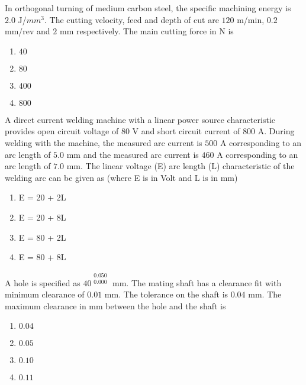     \item In orthogonal turning of medium carbon steel, the specific machining energy is $2.0$ J/$mm^{3}$. The cutting velocity, feed and depth of cut are $120$ m/min, $0.2$ mm/rev and $2$ mm respectively. The main cutting force in N is
    \begin{multicols}{4}
        \begin{enumerate}
            \item $40$
            \item $80$
            \item $400$
            \item $800$
        \end{enumerate}
    \end{multicols}

    \item A direct current welding machine with a linear power source characteristic provides open circuit voltage of $80$ V and short circuit current of $800$ A. During welding with the machine, the measured arc current is $500$ A corresponding to an arc length of $5.0$ mm and the measured arc current is $460$ A corresponding to an arc length of $7.0$ mm. The linear voltage (E) arc length (L) characteristic of the welding arc can be given as (where E is in Volt and L is in mm)
    \begin{multicols}{4}
        \begin{enumerate}
            \item E = 20 + 2L
            \item E = 20 + 8L
            \item E = 80 + 2L
            \item E = 80 + 8L
        \end{enumerate}
    \end{multicols}

    \item A hole is specified as $40^{\begin{matrix} 0.050 \\ 0.000 \end{matrix}}$ mm. The mating shaft has a clearance fit with minimum clearance of $0.01$ mm. The tolerance on the shaft is $0.04$ mm. The maximum clearance in mm between the hole and the shaft is
    \begin{multicols}{4}
        \begin{enumerate}
            \item $0.04$
            \item $0.05$
            \item $0.10$
            \item $0.11$
        \end{enumerate}
    \end{multicols}

